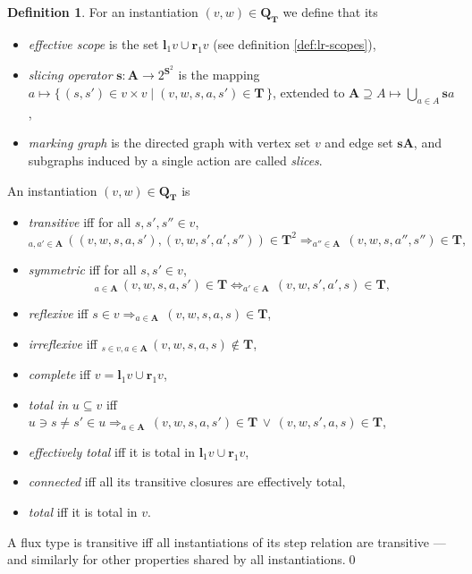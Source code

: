 \documentclass [a4paper,12pt] {article}
\theoremstyle{definition}
\newtheorem{definition}{Definition}[section]
\newcommand{\Forall}{}
\DeclareRobustCommand{\Forall}{\mathop{\mathlarger{\forall}}}
\newcommand{\Exists}{}
\DeclareRobustCommand{\Exists}{\mathop{\mathlarger{\exists}}}
\begin{document}
\begin {definition}
For an instantiation $(v, w) \in \mathbf {Q}_{\mathbf {T}}$ we define
that its
%
\begin {itemize}
\item {\em effective scope}\/ is the set $\bm {l}_1v\cup\bm {r}_1v$
  (see definition \ref {def:lr-scopes}),
\item {\em slicing operator}\/ $\bm {s}\!: \mathbf {A} \rightarrow
  2^{\mathbf {S}^2}$ is the mapping $a \mapsto \{\, (s, s') \in
  v{\times}v \;|\; (v, w, s, a, s') \in \mathbf {T}\, \}$, extended to
  $\mathbf {A} \supseteq A \mapsto \bigcup_{a \in A}\bm {s}a$,
%
\item {\em marking graph}\/ is the directed graph with vertex set $v$
  and edge set $\bm {s}\mathbf {A}$, and subgraphs induced by a single
  action are called {\em slices}\/.
\end {itemize}
%
An instantiation $(v, w) \in \mathbf {Q}_{\mathbf {T}}$ is
%
\begin {itemize}
\item {\em transitive}\/ iff for all $s, s', s'' \in v$,
  \begin {equation*}
    \Exists_{a,a' \in \mathbf {A}}\,((v,w,s,a,s'), (v,w,s',a',s'')) \in \mathbf {T}^2
    \Longrightarrow \Exists_{a'' \in \mathbf {A}}\,(v,w,s,a'',s'') \in \mathbf {T},
  \end {equation*}
\item {\em symmetric}\/ iff for all $s, s' \in v$,
  \begin {equation*}
    \Exists_{a \in \mathbf {A}}\,(v,w,s,a,s') \in \mathbf {T}
    \iff \Exists_{a' \in \mathbf {A}}\,(v,w,s',a',s) \in \mathbf {T},
  \end {equation*}
\item {\em reflexive}\/ iff $s \in v \Longrightarrow \Exists_{a \in
  \mathbf {A}}\,(v,w,s,a,s) \in \mathbf {T}$,
\item {\em irreflexive}\/ iff $ \Forall_{s \in v, a \in \mathbf
  {A}}\,(v,w,s,a,s) \not\in \mathbf {T}$,
\item {\em complete}\/ iff $v = \bm {l}_1v \cup \bm {r}_1v$,
\item {\em total in}\/ $u \subseteq v$ iff $u \ni s \neq s' \in u
  \Longrightarrow \Exists_{a \in \mathbf {A}}\,(v, w, s, a, s') \in
  \mathbf {T} \,\lor\, (v, w, s', a, s) \in \mathbf {T}$,
\item {\em effectively total}\/ iff it is total in $\bm {l}_1v \cup
  \bm {r}_1v$,
\item {\em connected}\/ iff all its transitive closures are
  effectively total,
\item {\em total}\/ iff it is total in $v$.
\end {itemize}
%
A flux type is transitive iff all instantiations of its step relation
are transitive --- and similarly for other properties shared by all
instantiations.\qed
\end {definition}
\end{document}
